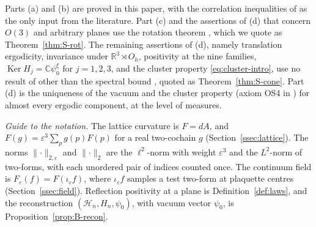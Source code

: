 \documentclass[11pt]{amsart}
\theoremstyle{plain}
\theoremstyle{definition}
\theoremstyle{remark}
\numberwithin{equation}{section}
\newcommand{\R}{\mathbb{R}}
\newcommand{\C}{\mathbb{C}}
\newcommand{\eps}{\varepsilon}
\newcommand{\cH}{\mathcal{H}}
\newcommand{\Oh}{O_h}
\newcommand{\norm}[1]{\lVert #1\rVert}
\newcommand{\Ker}{\operatorname{Ker}}
\begin{document}
Parts (a) and (b) are proved in this paper, with the correlation inequalities of \cite{BFS1} as the only input from the literature. Part (c) and the assertions of (d) that concern $O(3)$ and arbitrary planes use the rotation theorem \cite[Thm.~18.21]{S}, which we quote as Theorem~\ref{thm:S-rot}. The remaining assertions of (d), namely translation ergodicity, invariance under $\R^3\rtimes\Oh$, positivity at the nine families, $\Ker H_j=\C\psi_0^\xi$ for $j=1,2,3$, and the cluster property \eqref{eq:cluster-intro}, use no result of \cite{S} other than the spectral bound \cite[Prop.~18.1]{S}, quoted as Theorem~\ref{thm:S-cone}. Part (d) is the uniqueness of the vacuum and the cluster property \cite[(E4)]{OS73} (axiom OS4 in \cite[Sect.~6.1]{GJ}) for almost every ergodic component, at the level of measures.

\emph{Guide to the notation.} The lattice curvature is $F=dA$, and $F(g)=\eps^3\sum_pg(p)F(p)$ for a real two-cochain $g$ (Section~\ref{ssec:lattice}). The norms $\norm{\cdot}_{2,\eps}$ and $\norm{\cdot}_2$ are the $\ell^2$-norm with weight $\eps^3$ and the $L^2$-norm of two-forms, with each unordered pair of indices counted once. The continuum field is $F_\eps(f)=F(\iota_\eps f)$, where $\iota_\eps f$ samples a test two-form at plaquette centres (Section~\ref{ssec:field}). Reflection positivity at a plane is Definition~\ref{def:laws}, and the reconstruction $(\cH_n,H_n,\psi_0)$, with vacuum vector $\psi_0$, is Proposition~\ref{prop:B-recon}.
\end{document}
